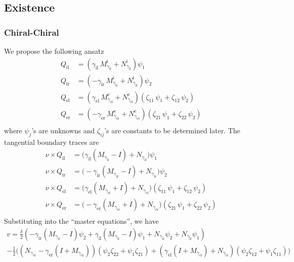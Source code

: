 %
 
\subsection{Existence}

\subsubsection{Chiral-Chiral}

We propose the following ansatz 
\begin{align*}
  Q_\text{il} &= \left(\gamma_\text{il}\,M_{\gamma_\text{il}}^\text{i} + N_{\gamma_\text{il}}^\text{i}\right)\psi_1 \\
  Q_\text{ir} &= \left(-\gamma_\text{ir}\,M_{\gamma_\text{ir}}^\text{i} + N_{\gamma_\text{ir}}^\text{i}\right)\psi_2 \\
  Q_\text{el} &= \left(\gamma_\text{el}\,M_{\gamma_\text{el}}^\text{e} + N_{\gamma_\text{el}}^\text{e}\right)(\zeta_{11}\,\psi_1 + \zeta_{12}\,\psi_2) \\
  Q_\text{er} &= \left(-\gamma_\text{er}\,M_{\gamma_\text{er}}^\text{e} + N_{\gamma_\text{er}}^\text{e}\right)(\zeta_{21}\,\psi_1 + \zeta_{22}\,\psi_2) \\
\end{align*}
where $\psi_j$'s are unknowns and $\zeta_{ij}$'s are constants to be determined later. The tangential boundary traces are 
\begin{align*}
  \nu\times Q_\text{il} &= \bigl(\gamma_\text{il}(M_{\gamma_\text{il}} -I) + N_{\gamma_\text{il}}\bigr)\psi_1 \\
  \nu\times Q_\text{ir} &= \bigl(-\gamma_\text{ir}(M_{\gamma_\text{ir}} -I) + N_{\gamma_\text{ir}}\bigr)\psi_2 \\
  \nu\times Q_\text{el} &= \bigl(\gamma_\text{el}(M_{\gamma_\text{el}} + I) + N_{\gamma_\text{el}}\bigr)(\zeta_{11}\,\psi_1 + \zeta_{12}\,\psi_2) \\
  \nu\times Q_\text{er} &= \bigl(-\gamma_\text{er}(M_{\gamma_\text{er}} + I) + N_{\gamma_\text{er}}\bigr)(\zeta_{21}\,\psi_1 + \zeta_{22}\,\psi_2) \\
\end{align*}
Substituting into the ``master equations'', we have
\begin{multline*}
  v = \frac{\delta}{2} (-\gamma_\text{ir} (M_{\gamma_\text{ir}}-I)\psi_2 +\gamma_\text{il}(M_{\gamma_\text{il}}-I) \psi_1 +N_{\gamma_\text{ir}} \psi_2+N_{\gamma_\text{il}} \psi_1) \\
  - \frac{1}{2}\bigl((N_{\gamma_\text{er}}-\gamma_\text{er} (I+M_{\gamma_\text{er}}))(\psi_2 \zeta_{22}+\psi_1 \zeta_{21})+(\gamma_\text{el} (I+M_{\gamma_\text{el}})+N_{\gamma_\text{el}})(\psi_2 \zeta_{12}+\psi_1 \zeta_{11}) \bigr)
\end{multline*}
